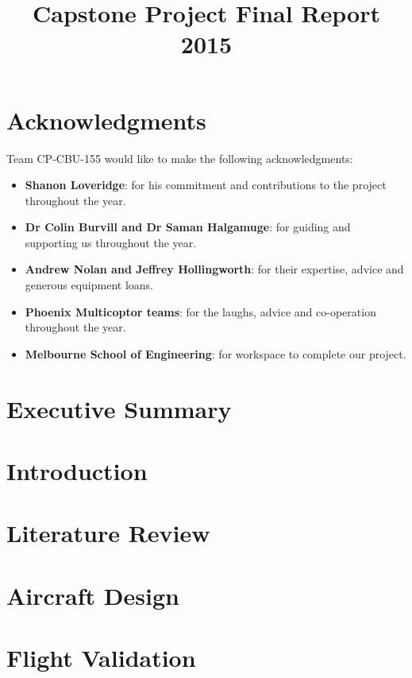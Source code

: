 \documentclass{article}
\title{Capstone Project
	  \vfill
	Final Report
	\vfill
	2015}
\author{}
\date{}
\newcommand{\ID}{CP-CBU-155 }
\begin{document}
	


\newpage

\section*{Acknowledgments}
Team \ID would like to make the following acknowledgments:
\begin{itemize}
	\item \textbf{Shanon Loveridge}: for his commitment and contributions to the project throughout the year.
	\item \textbf{Dr Colin Burvill and Dr Saman Halgamuge}: for guiding and supporting us throughout the year.
	\item \textbf{Andrew Nolan and Jeffrey Hollingworth}: for their expertise, advice and generous equipment loans.
	\item \textbf{Phoenix Multicoptor teams}: for the laughs, advice and co-operation throughout the year.
	\item \textbf{Melbourne School of Engineering}: for workspace to complete our project.
\end{itemize}



\newpage

\section{Executive Summary}


\newpage

\section{Introduction}


\section{Literature Review}


\section{Aircraft Design}


\section{Flight Validation}

\end{document}
